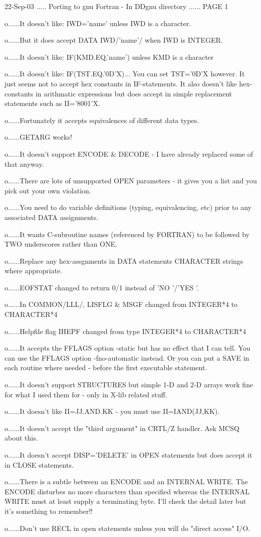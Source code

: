22-Sep-03 ..... Porting to gnu Fortran - In DDgnu directory ...... PAGE   1
 
o......It doesn't like: IWD='name' unless IWD is a character.
 
o......But it does accept DATA IWD/'name'/ when IWD is INTEGER.
 
o......It doesn't like: IF(KMD.EQ.'name') unless KMD is a character
 
o......It  doesn't like: IF(TST.EQ.'0D'X)... You can set TST='0D'X however.
       It just seems not to accept hex constants in IF-statements. It  also
       doesn't  like  hex-constants  in  arithmatic  expressions  but  does
       accept in simple replacement statements such as II='8001'X.
 
o......Fortunately it accepts equivalences of different data types.
 
o......GETARG works!
 
o......It doesn't support ENCODE & DECODE - I have  already  replaced  some
       of that anyway.
 
o......There  are lots of unsupported OPEN parameters - it gives you a list
       and you pick out your own violation.
 
o......You need to do variable  definitions  (typing,  equivalencing,  etc)
       prior to any associated DATA assignments.
 
o......It  wants  C-subroutine names (referenced by FORTRAN) to be followed
       by TWO underscores rather than ONE.
 
o......Replace any hex-assgnments  in  DATA  statements  CHARACTER  strings
       where appropriate.
 
o......EOFSTAT changed to return 0/1 instead of 'NO  '/'YES '.
 
o......In COMMON/LLL/, LISFLG & MSGF changed from INTEGER*4 to CHARACTER*4
 
o......Helpfile flag IHEPF changed from type INTEGER*4 to CHARACTER*4
 
o......It  accepts  the  FFLAGS option -static but has no effect that I can
       tell. You can use the FFLAGS option -fno-automatic instead.  Or  you
       can  put  a  SAVE  in  each  routine where needed - before the first
       executable statement.
 
o......It doesn't support STRUCTURES but simple 1-D  and  2-D  arrays  work
       fine for what I used them for - only in X-lib related stuff.
 
o......It doesn't like II=JJ.AND.KK - you must use II=IAND(JJ,KK).
 
o......It  doesn't  accept the "third argument" in CRTL/Z handler. Ask MCSQ
       about this.
 
o......It doesn't accept DISP='DELETE' in OPEN statements but  does  accept
       it in CLOSE statements.
 
o......There  is  a  subtle  between  an  ENCODE and an INTERNAL WRITE. The
       ENCODE disturbes no  more  characters  than  specified  whereas  the
       INTERNAL  WRITE  must at least supply a terminating byte. I'll check
       the detail later but it's something to remember!!
 
o......Don't use RECL in open statements unless you will do "direct access"
       I/O.
